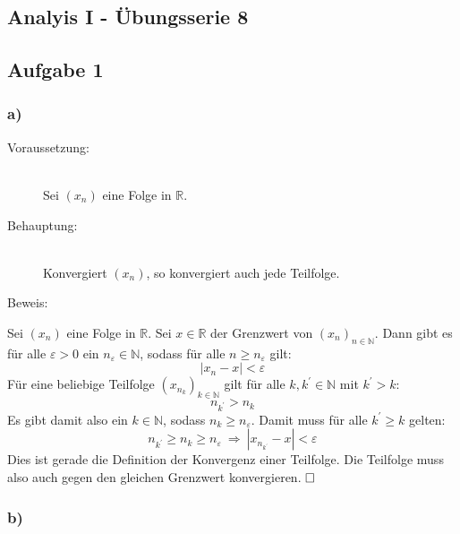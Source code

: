 \documentclass[10pt, a4paper]{article}
\begin{document}
	\begin{center}
		\section*{Analyis I - Übungsserie 8} %
		\label{sec:analyis_i_bungsserie_8}
		
	\end{center}

	\subsection*{Aufgabe 1} %
	\label{sub:aufgabe_1}
	
		\subsubsection*{a)} %
		\label{ssub:a_}
		
			\begin{description}
				\item[Voraussetzung:] \hfill \\
					Sei $(x_n)$ eine Folge in $\mathbb{R}$.
				\item[Behauptung:] \hfill \\
					Konvergiert $(x_n)$, so konvergiert auch jede Teilfolge.
				\item[Beweis:]
			\end{description}
			
			Sei $(x_n)$ eine Folge in $\mathbb{R}$. Sei $x \in \mathbb{R}$ der Grenzwert von $(x_n)_{n\in \mathbb{N}}$. Dann gibt es für alle $\varepsilon > 0$ ein $n_{\varepsilon}\in \mathbb{N}$, sodass für alle $n\geq n_{\varepsilon}$ gilt:
			\[
				|x_n-x| < \varepsilon
			\]
			Für eine beliebige Teilfolge $(x_{n_k})_{k\in \mathbb{N}}$ gilt	für alle $k,k^\prime \in \mathbb{N}$ mit $k^\prime > k$:
			\[
				n_{k^\prime} > n_k
			\]
			Es gibt damit also ein $k \in \mathbb{N}$, sodass $n_k \geq n_\varepsilon$. Damit muss für alle $k^\prime \geq k$ gelten:
			\[
				n_{k^\prime} \geq n_k \geq n_\varepsilon \ \Rightarrow \ |x_{n_{k^\prime}}-x| < \varepsilon
			\]
			Dies ist gerade die Definition der Konvergenz einer Teilfolge. Die Teilfolge muss also auch gegen den gleichen Grenzwert konvergieren. $\hfill\Box$


		\subsubsection*{b)} %
		\label{ssub:b_}
		
\end{document}
